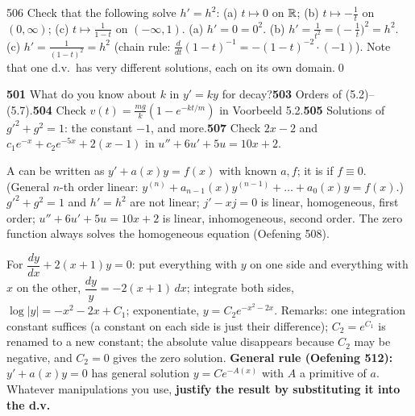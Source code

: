\begin{bookex}{506}
Check that the following solve $h'=h^2$: (a) $t\mapsto0$ on $\mathbb{R}$; (b) $t\mapsto-\frac1t$ on $(0,\infty)$; (c) $t\mapsto\frac1{1-t}$ on $(-\infty,1)$.
\solution
(a) $h'=0=0^2$. (b) $h'=\frac1{t^2}=\big(-\frac1t\big)^2=h^2$. (c) $h'=\frac{1}{(1-t)^2}=h^2$ (chain rule: $\frac d{dt}(1-t)^{-1}=-(1-t)^{-2}\cdot(-1)$). Note that one d.v.\ has very different solutions, each on its own domain.\qed
\end{bookex}

\begin{trybox}[{501, 503, 504, 505, 507}]
\textbf{501} What do you know about $k$ in $y'=ky$ for decay?\quad \textbf{503} Orders of (5.2)--(5.7).\quad \textbf{504} Check $v(t)=\frac{mg}k(1-e^{-kt/m})$ in Voorbeeld 5.2.\quad \textbf{505} Solutions of $g'^2+g^2=1$: the constant $-1$, and more.\quad \textbf{507} Check $2x-2$ and $c_1e^{-x}+c_2e^{-5x}+2(x-1)$ in $u''+6u'+5u=10x+2$.
\end{trybox}

\begin{key}
A  can be written as $y'+a(x)y=f(x)$ with known $a,f$; it is  if $f\equiv0$. (General $n$-th order linear: $y^{(n)}+a_{n-1}(x)y^{(n-1)}+\dots+a_0(x)y=f(x)$.) $g'^2+g^2=1$ and $h'=h^2$ are not linear; $j'-xj=0$ is linear, homogeneous, first order; $u''+6u'+5u=10x+2$ is linear, inhomogeneous, second order. The zero function always solves the homogeneous equation (Oefening 508).
\end{key}
\begin{strategy}
For $\dfrac{dy}{dx}+2(x+1)y=0$: put everything with $y$ on one side and everything with $x$ on the other, $\dfrac{dy}y=-2(x+1)\,dx$; integrate both sides, $\log|y|=-x^2-2x+C_1$; exponentiate, $y=C_2e^{-x^2-2x}$. Remarks: one integration constant suffices (a constant on each side is just their difference); $C_2=e^{C_1}$ is renamed to a new constant; the absolute value disappears because $C_2$ may be negative, and $C_2=0$ gives the zero solution. \textbf{General rule (Oefening 512):} $y'+a(x)y=0$ has general solution $y=Ce^{-A(x)}$ with $A$ a primitive of $a$. Whatever manipulations you use, \textbf{justify the result by substituting it into the d.v.}
\end{strategy}

